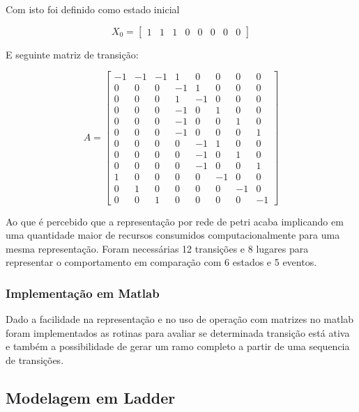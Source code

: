 \documentclass[a4paper,11pt]{article}
\begin{document}
Com isto foi definido como estado inicial

\begin{equation}
X_0 = \left[\begin{array}{cccccccc} 1 & 1 & 1 & 0 & 0 & 0 & 0 & 0 \end{array}\right]
\end{equation}

E seguinte matriz de transição:

\begin{equation}
A = \left[\begin{array}{cccccccc} -1 & -1 & -1 & 1 & 0 & 0 & 0 & 0\\ 0 & 0 & 0 & -1 & 1 & 0 & 0 & 0\\ 0 & 0 & 0 & 1 & -1 & 0 & 0 & 0\\ 0 & 0 & 0 & -1 & 0 & 1 & 0 & 0\\ 0 & 0 & 0 & -1 & 0 & 0 & 1 & 0\\ 0 & 0 & 0 & -1 & 0 & 0 & 0 & 1\\ 0 & 0 & 0 & 0 & -1 & 1 & 0 & 0\\ 0 & 0 & 0 & 0 & -1 & 0 & 1 & 0\\ 0 & 0 & 0 & 0 & -1 & 0 & 0 & 1\\ 1 & 0 & 0 & 0 & 0 & -1 & 0 & 0\\ 0 & 1 & 0 & 0 & 0 & 0 & -1 & 0\\ 0 & 0 & 1 & 0 & 0 & 0 & 0 & -1 \end{array}\right]
\end{equation}

Ao que é percebido que a representação por rede de petri acaba implicando em uma quantidade maior de recursos consumidos computacionalmente para uma mesma representação. Foram necessárias 12 transições e 8 lugares para representar o comportamento em comparação com 6 estados e 5 eventos.

\subsubsection{Implementação em Matlab}

Dado a facilidade na representação e no uso de operação com matrizes no matlab foram implementados as rotinas para avaliar se determinada transição está ativa e também a possibilidade de gerar um ramo completo a partir de uma sequencia de transições.

\subsection{Modelagem em Ladder}
\end{document}
